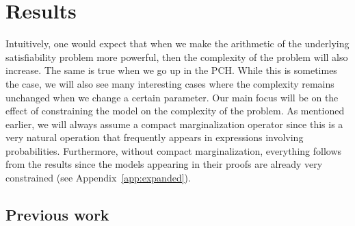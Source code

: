 \documentclass[a4paper,UKenglish,cleveref, autoref, thm-restate]{lipics-v2021}
\newcommand{\procOrFullVersion}[2]{#2}
\begin{document}
\section{Results}
\label{sec:results}

Intuitively, one would expect that when we make the arithmetic of the underlying satisfiability problem more powerful, then the complexity of the problem will also increase. The same is true when we go up in the PCH. While this is sometimes the case, we will also see many interesting cases where the complexity remains unchanged when we change a certain parameter. Our main focus will be on the effect of constraining the model on the complexity of the problem. As mentioned earlier, we will always assume a compact marginalization operator since this is a very natural operation that frequently appears in expressions involving probabilities. Furthermore, without compact marginalization, everything follows from the results \cite{fagin1990logic, ibeling2022mosse} since the models appearing in their proofs are already very constrained (see \procOrFullVersion{the full version}{Appendix~\ref{app:expanded}}). 



\subsection{Previous work}
\end{document}
